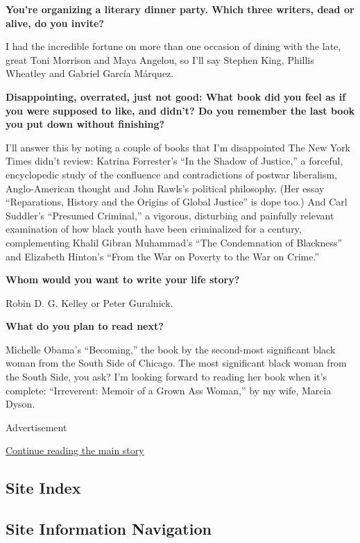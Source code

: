 \textbf{You're organizing a literary dinner party. Which three writers,
dead or alive, do you invite?}

I had the incredible fortune on more than one occasion of dining with
the late, great Toni Morrison and Maya Angelou, so I'll say Stephen
King, Phillis Wheatley and Gabriel García Márquez.

\textbf{Disappointing, overrated, just not good: What book did you feel
as if you were supposed to like, and didn't? Do you remember the last
book you put down without finishing?}

I'll answer this by noting a couple of books that I'm disappointed The
New York Times didn't review: Katrina Forrester's ``In the Shadow of
Justice,'' a forceful, encyclopedic study of the confluence and
contradictions of postwar liberalism, Anglo-American thought and John
Rawls's political philosophy. (Her essay ``Reparations, History and the
Origins of Global Justice'' is dope too.) And Carl Suddler's ``Presumed
Criminal,'' a vigorous, disturbing and painfully relevant examination of
how black youth have been criminalized for a century, complementing
Khalil Gibran Muhammad's ``The Condemnation of Blackness'' and Elizabeth
Hinton's ``From the War on Poverty to the War on Crime.''

\textbf{Whom would you want to write your life story?}

Robin D. G. Kelley or Peter Guralnick.

\textbf{What do you plan to read next?}

Michelle Obama's ``Becoming,'' the book by the second-most significant
black woman from the South Side of Chicago. The most significant black
woman from the South Side, you ask? I'm looking forward to reading her
book when it's complete: ``Irreverent: Memoir of a Grown Ass Woman,'' by
my wife, Marcia Dyson.

Advertisement

\protect\hyperlink{after-bottom}{Continue reading the main story}

\hypertarget{site-index}{%
\subsection{Site Index}\label{site-index}}

\hypertarget{site-information-navigation}{%
\subsection{Site Information
Navigation}\label{site-information-navigation}}

